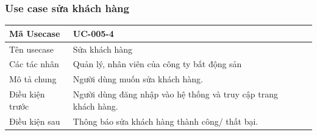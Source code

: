 \documentclass[12pt,a4paper]{article}
\begin{document}
    \subsubsection*{Use case sửa khách hàng }
    \begin{table}[H]
        \centering
        \begin{tabular}{|p{3.5cm}|p{11.5cm}|c|}
            \hline
            Mã Usecase      & UC-005-4                                                        \\
            \hline
            Tên usecase     & Sửa khách hàng                                                  \\
            \hline
            Các tác nhân    & Quản lý, nhân viên của công ty bất động sản                     \\
            \hline
            Mô tả chung     & Người dùng muốn sửa khách hàng.                                 \\
            \hline

            Điều kiện trước & Người dùng đăng nhập vào hệ thống và truy cập trang khách hàng. \\
            \hline

            Điều kiện sau   & Thông báo sửa khách hàng thành công/ thất bại.                  \\
            \hline


\end{tabular}
\end{table}
\end{document}
